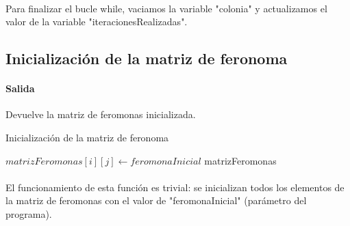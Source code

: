 	\paragraph{}Para finalizar el bucle while, vaciamos la variable "colonia" y actualizamos el valor de la variable "iteracionesRealizadas".
	
	\subsection{Inicialización de la matriz de feronoma}
	
	\paragraph{Salida}Devuelve la matriz de feromonas inicializada.
	
	\begin{algorithm}[H]
		\caption{Inicialización de la matriz de feronoma}
		\begin{algorithmic}
			\STATE $matrizFeromonas[i][j] \leftarrow feromonaInicial$
			\ENDFOR
			\ENDFOR
			\RETURN matrizFeromonas
		\end{algorithmic}
	\end{algorithm}

	\paragraph{}El funcionamiento de esta función es trivial: se inicializan todos los elementos de la matriz de feromonas con el valor de "feromonaInicial" (parámetro del programa).